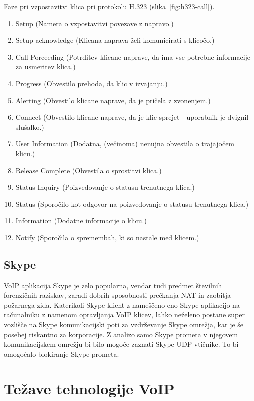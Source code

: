 \documentclass{acm_proc_article-sp}
\begin{document}
Faze pri vzpostavitvi klica pri protokolu H.323 (slika~\ref{fig:h323-call}).
\begin{enumerate}
  \item Setup (Namera o vzpostavitvi povezave z napravo.)
  \item Setup acknowledge (Klicana naprava želi komunicirati s klicočo.)
  \item Call Porceeding (Potrditev klicane naprave, da ima vse potrebne informacije za usmeritev klica.)
  \item Progress (Obvestilo prehoda, da klic v izvajanju.)
  \item Alerting (Obvestilo klicane naprave, da je pričela z zvonenjem.)
  \item Connect (Obvestilo klicane naprave, da je klic sprejet - uporabnik je dvignil slušalko.)
  \item User Information (Dodatna, (večinoma) nenujna obvestila o trajajočem klicu.)
  \item Release Complete (Obvestila o sprostitvi klica.)
  \item Status Inquiry (Poizvedovanje o statusu trenutnega klica.)
  \item Status (Sporočilo kot odgovor na poizvedovanje o statusu trenutnega klica.)
  \item Information (Dodatne informacije o klicu.)
  \item Notify (Sporočila o spremembah, ki so nastale med klicem.)
\end{enumerate}


\subsection{Skype}
VoIP aplikacija Skype je zelo popularna, vendar tudi predmet številnih forenzičnih raziskav, zaradi dobrih sposobnosti prečkanja NAT\cite{NAT} in zaobitja požarnega zida. Katerikoli Skype klient z nameščeno eno Skype aplikacijo na računalniku z namenom opravljanja VoIP klicev, lahko neželeno postane super vozlišče na Skype komunikacijski poti za vzdrževanje Skype omrežja, kar je še posebej riskantno za korporacije. Z analizo samo Skype prometa v njegovem komunikacijskem omrežju bi bilo mogoče zaznati Skype UDP vtičnike. To bi omogočalo blokiranje Skype prometa.

\section{Težave tehnologije VoIP}
\end{document}
